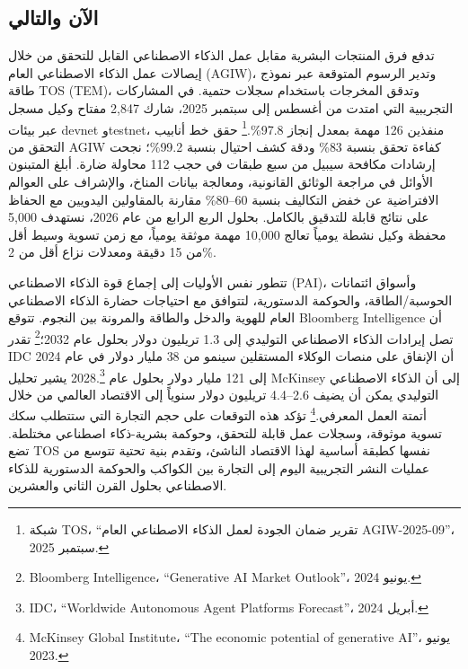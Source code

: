\documentclass[11pt]{article}
\begin{document}
\subsection{الآن والتالي}
\begin{description}[leftmargin=2.1cm, style=nextline]
  \item[12--24 شهراً] تدفع فرق المنتجات البشرية مقابل عمل الذكاء الاصطناعي القابل للتحقق من خلال إيصالات عمل الذكاء الاصطناعي العام (AGIW)، وتدير الرسوم المتوقعة عبر نموذج طاقة TOS (TEM)، وتدقق المخرجات باستخدام سجلات حتمية. في المشاركات التجريبية التي امتدت من أغسطس إلى سبتمبر 2025، شارك 2,847 مفتاح وكيل مسجل عبر بيئات devnet وtestnet، منفذين 126 مهمة بمعدل إنجاز 97.8\%.\footnote{شبكة TOS، ``تقرير ضمان الجودة لعمل الذكاء الاصطناعي العام AGIW-2025-09''، سبتمبر 2025.} حقق خط أنابيب التحقق من AGIW كفاءة تحقق بنسبة 83\% ودقة كشف احتيال بنسبة 99.2\%؛ نجحت إرشادات مكافحة سيبيل من سبع طبقات في حجب 112 محاولة ضارة. أبلغ المتبنون الأوائل في مراجعة الوثائق القانونية، ومعالجة بيانات المناخ، والإشراف على العوالم الافتراضية عن خفض التكاليف بنسبة 60--80\% مقارنة بالمقاولين اليدويين مع الحفاظ على نتائج قابلة للتدقيق بالكامل. بحلول الربع الرابع من عام 2026، نستهدف 5,000 محفظة وكيل نشطة يومياً تعالج 10,000 مهمة موثقة يومياً، مع زمن تسوية وسيط أقل من 15 دقيقة ومعدلات نزاع أقل من 2\%.

  \item[قوس 100 عام] تتطور نفس الأوليات إلى إجماع قوة الذكاء الاصطناعي (PAI)، وأسواق ائتمانات الحوسبة/الطاقة، والحوكمة الدستورية، لتتوافق مع احتياجات حضارة الذكاء الاصطناعي العام للهوية والدخل والطاقة والمرونة بين النجوم. تتوقع Bloomberg Intelligence أن تصل إيرادات الذكاء الاصطناعي التوليدي إلى 1.3 تريليون دولار بحلول عام 2032؛\footnote{Bloomberg Intelligence، ``Generative AI Market Outlook''، يونيو 2024.} تقدر IDC أن الإنفاق على منصات الوكلاء المستقلين سينمو من 38 مليار دولار في عام 2024 إلى 121 مليار دولار بحلول عام 2028.\footnote{IDC، ``Worldwide Autonomous Agent Platforms Forecast''، أبريل 2024.} يشير تحليل McKinsey إلى أن الذكاء الاصطناعي التوليدي يمكن أن يضيف 2.6--4.4 تريليون دولار سنوياً إلى الاقتصاد العالمي من خلال أتمتة العمل المعرفي.\footnote{McKinsey Global Institute، ``The economic potential of generative AI''، يونيو 2023.} تؤكد هذه التوقعات على حجم التجارة التي ستتطلب سكك تسوية موثوقة، وسجلات عمل قابلة للتحقق، وحوكمة بشرية-ذكاء اصطناعي مختلطة. تضع TOS نفسها كطبقة أساسية لهذا الاقتصاد الناشئ، وتقدم بنية تحتية تتوسع من عمليات النشر التجريبية اليوم إلى التجارة بين الكواكب والحوكمة الدستورية للذكاء الاصطناعي بحلول القرن الثاني والعشرين.
\end{description}
\end{document}
